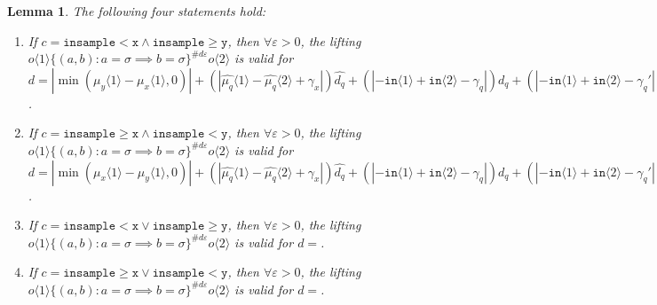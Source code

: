 \documentclass[12pt]{article}
\newcommand{\gguard}[1][x]{\texttt{insample}\geq #1}
\newcommand{\lguard}[1][x]{\texttt{insample} < #1}
\newcommand{\brangle}[1]{\langle #1 \rangle}
\newtheorem{lemma}[thm]{Lemma}
\theoremstyle{definition}
\begin{document}
\begin{lemma}
    The following four statements hold:\begin{enumerate}
        \item If $c = \lguard[\texttt{x}] \land \gguard[\texttt{y}]$, then $\forall \varepsilon>0$, the lifting $o\brangle{1}\{(a, b): a=\sigma\implies b=\sigma\}^{\#d\varepsilon}o\brangle{2}$ is valid for $d = |\min(\mu_y\brangle{1}-\mu_x\brangle{1}, 0)|+(|\hat{\mu_q}\brangle{1}-\hat{\mu_q}\brangle{2}+\gamma_x|)\hat{d_q}+(|-\texttt{in}\brangle{1}+\texttt{in}\brangle{2}-\gamma_q|)d_q+(|-\texttt{in}\brangle{1}+\texttt{in}\brangle{2}-\gamma_q'|)d_q'$. 
        \item If $c = \gguard[\texttt{x}] \land \lguard[\texttt{y}]$, then $\forall \varepsilon>0$, the lifting $o\brangle{1}\{(a, b): a=\sigma\implies b=\sigma\}^{\#d\varepsilon}o\brangle{2}$ is valid for $d = |\min(\mu_x\brangle{1}-\mu_y\brangle{1}, 0)|+(|\hat{\mu_q}\brangle{1}-\hat{\mu_q}\brangle{2}+\gamma_x|)\hat{d_q}+(|-\texttt{in}\brangle{1}+\texttt{in}\brangle{2}-\gamma_q|)d_q+(|-\texttt{in}\brangle{1}+\texttt{in}\brangle{2}-\gamma_q'|)d_q'$. 
        \item If $c = \lguard[\texttt{x}] \lor \gguard[\texttt{y}]$, then $\forall \varepsilon>0$, the lifting $o\brangle{1}\{(a, b): a=\sigma\implies b=\sigma\}^{\#d\varepsilon}o\brangle{2}$ is valid for $d = $. 
        \item If $c = \gguard[\texttt{x}] \lor \lguard[\texttt{y}]$, then $\forall \varepsilon>0$, the lifting $o\brangle{1}\{(a, b): a=\sigma\implies b=\sigma\}^{\#d\varepsilon}o\brangle{2}$ is valid for $d = $. 
    \end{enumerate}
\end{lemma}
\end{document}
